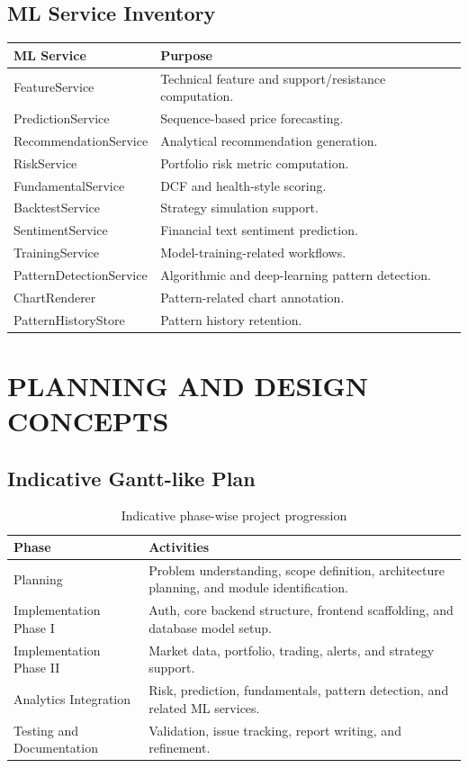 \documentclass[12pt,a4paper]{report}
\begin{document}
\section{ML Service Inventory}
\begin{longtable}{p{} p{}}
\textbf{ML Service} & \textbf{Purpose} \\
\hline
FeatureService & Technical feature and support/resistance computation. \\
PredictionService & Sequence-based price forecasting. \\
RecommendationService & Analytical recommendation generation. \\
RiskService & Portfolio risk metric computation. \\
FundamentalService & DCF and health-style scoring. \\
BacktestService & Strategy simulation support. \\
SentimentService & Financial text sentiment prediction. \\
TrainingService & Model-training-related workflows. \\
PatternDetectionService & Algorithmic and deep-learning pattern detection. \\
ChartRenderer & Pattern-related chart annotation. \\
PatternHistoryStore & Pattern history retention. \\
\end{longtable}

\chapter{PLANNING AND DESIGN CONCEPTS}
\section{Indicative Gantt-like Plan}
\begin{table}[H]
\centering
\caption{Indicative phase-wise project progression}
\begin{tabularx}{\textwidth}{>{\raggedright\arraybackslash}p{1.8in} X}
\toprule
\textbf{Phase} & \textbf{Activities} \\
\midrule
Planning & Problem understanding, scope definition, architecture planning, and module identification. \\
Implementation Phase I & Auth, core backend structure, frontend scaffolding, and database model setup. \\
Implementation Phase II & Market data, portfolio, trading, alerts, and strategy support. \\
Analytics Integration & Risk, prediction, fundamentals, pattern detection, and related ML services. \\
Testing and Documentation & Validation, issue tracking, report writing, and refinement. \\
\bottomrule
\end{tabularx}
\end{table}
\end{document}
